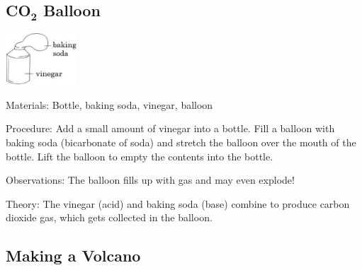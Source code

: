 \begin{multicols}{2}
\subsection{\textbf{CO}$_\textbf{2}$ Balloon}

\begin{center}
\includegraphics[width=0.2\textwidth]{./img/vso/co2-balloon.jpg}
\end{center}

\begin{description*}
\item[Materials:]{Bottle, baking soda, vinegar, balloon}
\item[Procedure:]{Add a small amount of vinegar into a bottle. Fill a balloon with baking soda (bicarbonate of soda) and stretch the balloon over the mouth of the bottle. Lift the balloon to empty the contents into the bottle.}
\item[Observations:]{The balloon fills up with gas and may even explode!}
\item[Theory:]{The vinegar (acid) and baking soda (base) combine to produce carbon dioxide gas, which gets collected in the balloon.}
\end{description*}

\subsection{Making a Volcano} %



\end{multicols}
